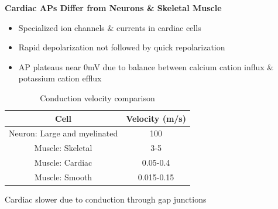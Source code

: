 \documentclass[11pt,fleqn]{book}
\begin{document}
\textbf{Cardiac APs Differ from Neurons \&
Skeletal Muscle}
\begin{itemize}
    \item Specialized ion channels \&
currents in cardiac cells
    \item Rapid depolarization not
followed by quick
repolarization
    \item AP plateaus near 0mV due
to balance between calcium cation
influx \& potassium cation efflux
\end{itemize}
\begin{table}[]
    \centering
\begin{tabular}{cc}
\textbf{Cell}  & \textbf{Velocity (m/s)} \\
\hline
Neuron: Large and myelinated  & 100 \\
Muscle: Skeletal  & 3-5 \\
Muscle: Cardiac  & 0.05-0.4 \\
Muscle: Smooth  & 0.015-0.15 
\end{tabular}
    \caption{Conduction velocity comparison}
    \label{tab:my_label}
\end{table}

\begin{remark}
    Cardiac slower due to
conduction through
gap junctions
\end{remark}
\end{document}
